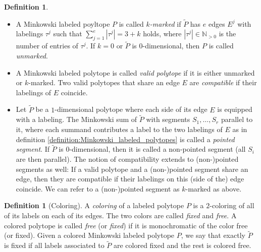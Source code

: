 \documentclass[11pt,reqno,a4]{amsart}
\theoremstyle{dotless}
\theoremstyle{definition}
\newtheorem{definition}[corollary]{Definition}
\begin{document}
\begin{definition}~\vspace{-\baselineskip}
\begin{itemize}
\item
A Minkowski labeled poyltope $P$ is called \textit{$k$-marked} if $\tilde{P}$ has $e$ edges $E^j$ with labelings $\tau^j$ such that $\sum_{j=1}^{e} |\tau^j|=3+k$ holds, where $|\tau^j|\in\mathbb{N}_{>0}$ is the number of entries of $\tau^j$. If $k=0$ or $\tilde{P}$ is $0$-dimensional, then $P$ is called \textit{unmarked}.

\item
A Minkowski labeled polytope is called \textit{valid polytope} if it is either unmarked or $k$-marked. Two valid polytopes that share an edge $E$ are \textit{compatible} if their labelings of $E$ coincide.
\item
Let $\tilde{P}$ be a $1$-dimensional polytope where each side of its edge $E$ is equipped with a labeling. The Minkowski sum of $\tilde{P}$ with segments $S_1,\dots,S_r$ parallel to it, where each summand contributes a label to the two labelings of $E$ as in definition \ref{definition:Minkowski_labeled_polytopes} is called a \textit{pointed segment}. If $\tilde{P}$ is $0$-dimensional, then it is called a non-pointed segment (all $S_i$ are then parallel). The notion of compatibility extends to (non-)pointed segments as well: If a valid polytope and a (non-)pointed segment share an edge, then they are compatible if their labelings on this (side of the) edge coincide. We can refer to a (non-)pointed segment as $k$-marked as above. 
\end{itemize}
\end{definition}


\begin{definition}[Coloring]
A \textit{coloring} of a labeled polytope $P$ is a $2$-coloring of all of its labels on each of its edges. 
The two colors are called \textit{fixed} and \textit{free}. A colored polytope is called \textit{free} (or \textit{fixed}) if it is monochromatic of the color free (or fixed). Given a colored Minkowski labeled polytope $P$, we say that exactly $\tilde{P}$ is fixed if all labels associated to $\tilde{P}$ are colored fixed and the rest is colored free.
\end{definition}
\end{document}
